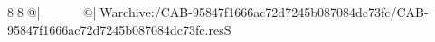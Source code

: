 8  8  @|                                                  @| W   archive:/CAB-95847f1666ac72d7245b087084dc73fc/CAB-95847f1666ac72d7245b087084dc73fc.resS 